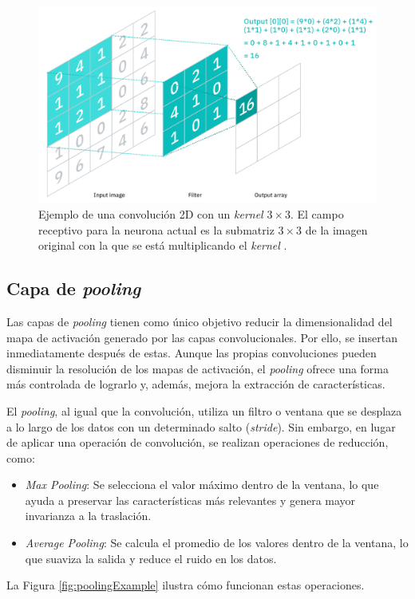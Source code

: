 \begin{figure}[h]
    \centering
    \includegraphics[width=\linewidth]{figures/2_theory/convolution.png}
    \caption[Ejemplo del operador de convolución]{Ejemplo de una convolución 2D con un \textit{kernel} $3 \times 3$. El campo receptivo para la neurona actual es la submatriz $3\times3$ de la imagen original con la que se está multiplicando el \textit{kernel} \cite{noauthor_what_2021}.}
    \label{fig:convolution}
\end{figure}

\subsection{Capa de \textit{pooling}}

Las capas de \textit{pooling} tienen como único objetivo reducir la dimensionalidad del mapa de activación generado por las capas convolucionales. Por ello, se insertan inmediatamente después de estas. Aunque las propias convoluciones pueden disminuir la resolución de los mapas de activación, el \textit{pooling} ofrece una forma más controlada de lograrlo y, además, mejora la extracción de características.

El \textit{pooling}, al igual que la convolución, utiliza un filtro o ventana que se desplaza a lo largo de los datos con un determinado salto (\textit{stride}). Sin embargo, en lugar de aplicar una operación de convolución, se realizan operaciones de reducción, como:
\begin{itemize}
    \item \textit{Max Pooling}: Se selecciona el valor máximo dentro de la ventana, lo que ayuda a preservar las características más relevantes y genera mayor invarianza a la traslación.
    \item \textit{Average Pooling}: Se calcula el promedio de los valores dentro de la ventana, lo que suaviza la salida y reduce el ruido en los datos.
\end{itemize}
La Figura \ref{fig:poolingExample} ilustra cómo funcionan estas operaciones.


